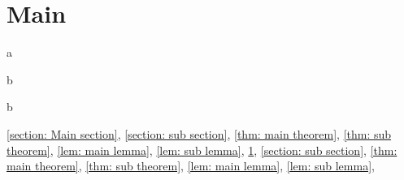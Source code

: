 \documentclass[uplatex,dvipdfmx]{jsarticle}
\begin{document}
\tableofcontents

\section{Main}\label{section: Main section}
a
\begin{thm}\label{thm: main theorem}
  b
\end{thm}
\begin{lem}\label{lem: main lemma}
  b
\end{lem}



\autoref{section: Main section},
\autoref{section: sub section},
\autoref{thm: main theorem},
\autoref{thm: sub theorem},
\autoref{lem: main lemma},
\autoref{lem: sub lemma},
\ref{section: Main section},
\ref{section: sub section},
\ref{thm: main theorem},
\ref{thm: sub theorem},
\ref{lem: main lemma},
\ref{lem: sub lemma},

\cite{Ha}

\printbibliography
\end{document}
